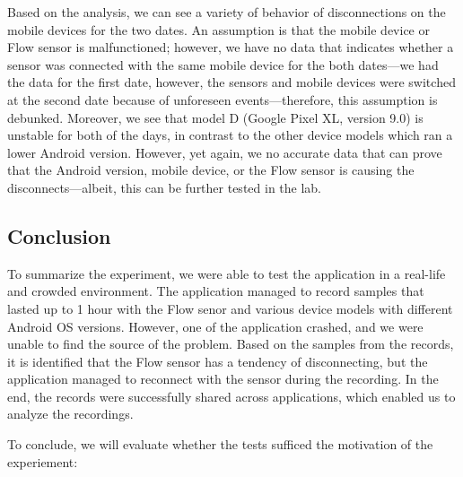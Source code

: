 Based on the analysis, we can see a variety of behavior of disconnections on the mobile devices for the two dates. An assumption is that the mobile device or Flow sensor is malfunctioned; however, we have no data that indicates whether a sensor was connected with the same mobile device for the both dates---we had the data for the first date, however, the sensors and mobile devices were switched at the second date because of unforeseen events---therefore, this assumption is debunked. Moreover, we see that model D (Google Pixel XL, version 9.0) is unstable for both of the days, in contrast to the other device models which ran a lower Android version. However, yet again, we no accurate data that can prove that the Android version, mobile device, or the Flow sensor is causing the disconnects---albeit, this can be further tested in the lab.

\subsection{Conclusion}
To summarize the experiment, we were able to test the application in a real-life and crowded environment. The application managed to record samples that lasted up to 1 hour with the Flow senor and various device models with different Android OS versions. However, one of the application crashed, and we were unable to find the source of the problem. Based on the samples from the records, it is identified that the Flow sensor has a tendency of disconnecting, but the application managed to reconnect with the sensor during the recording. In the end, the records were successfully shared across applications, which enabled us to analyze the recordings.  

To conclude, we will evaluate whether the tests sufficed the motivation of the experiement:

